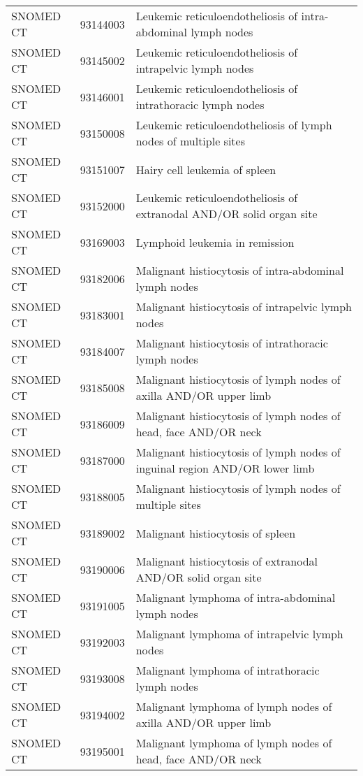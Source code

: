 \begin{table}[ht]
\begin{tabular}{lll}
  SNOMED CT & 93144003 & Leukemic reticuloendotheliosis of intra-abdominal lymph nodes \\ 
  SNOMED CT & 93145002 & Leukemic reticuloendotheliosis of intrapelvic lymph nodes \\ 
  SNOMED CT & 93146001 & Leukemic reticuloendotheliosis of intrathoracic lymph nodes \\ 
  SNOMED CT & 93150008 & Leukemic reticuloendotheliosis of lymph nodes of multiple sites \\ 
  SNOMED CT & 93151007 & Hairy cell leukemia of spleen \\ 
  SNOMED CT & 93152000 & Leukemic reticuloendotheliosis of extranodal AND/OR solid organ site \\ 
  SNOMED CT & 93169003 & Lymphoid leukemia in remission \\ 
  SNOMED CT & 93182006 & Malignant histiocytosis of intra-abdominal lymph nodes \\ 
  SNOMED CT & 93183001 & Malignant histiocytosis of intrapelvic lymph nodes \\ 
  SNOMED CT & 93184007 & Malignant histiocytosis of intrathoracic lymph nodes \\ 
  SNOMED CT & 93185008 & Malignant histiocytosis of lymph nodes of axilla AND/OR upper limb \\ 
  SNOMED CT & 93186009 & Malignant histiocytosis of lymph nodes of head, face AND/OR neck \\ 
  SNOMED CT & 93187000 & Malignant histiocytosis of lymph nodes of inguinal region AND/OR lower limb \\ 
  SNOMED CT & 93188005 & Malignant histiocytosis of lymph nodes of multiple sites \\ 
  SNOMED CT & 93189002 & Malignant histiocytosis of spleen \\ 
  SNOMED CT & 93190006 & Malignant histiocytosis of extranodal AND/OR solid organ site \\ 
  SNOMED CT & 93191005 & Malignant lymphoma of intra-abdominal lymph nodes \\ 
  SNOMED CT & 93192003 & Malignant lymphoma of intrapelvic lymph nodes \\ 
  SNOMED CT & 93193008 & Malignant lymphoma of intrathoracic lymph nodes \\ 
  SNOMED CT & 93194002 & Malignant lymphoma of lymph nodes of axilla AND/OR upper limb \\ 
  SNOMED CT & 93195001 & Malignant lymphoma of lymph nodes of head, face AND/OR neck \\ 

\end{tabular}
\end{table}
